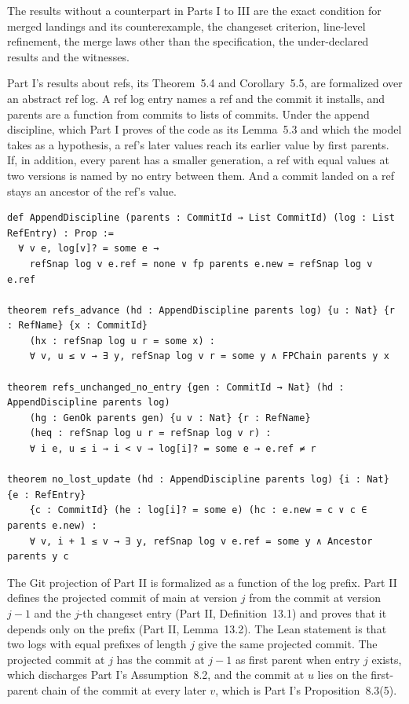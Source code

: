 \documentclass[11pt,letterpaper]{article}
\theoremstyle{definition}
\theoremstyle{remark}
\begin{document}
The results without a counterpart in Parts I to III are the exact condition for merged landings and its counterexample, the changeset criterion, line-level refinement, the merge laws other than the specification, the under-declared results and the witnesses.

Part I's results about refs, its Theorem~5.4 and Corollary~5.5, are formalized over an abstract ref log. A ref log entry names a ref and the commit it installs, and parents are a function from commits to lists of commits. Under the append discipline, which Part I proves of the code as its Lemma~5.3 and which the model takes as a hypothesis, a ref's later values reach its earlier value by first parents. If, in addition, every parent has a smaller generation, a ref with equal values at two versions is named by no entry between them. And a commit landed on a ref stays an ancestor of the ref's value.

\begin{lstlisting}[language=Lean,caption={Refs advance along first-parent chains (\texttt{YonedaTx/Graph.lean})},label={lst:mcbl:refs}]
def AppendDiscipline (parents : CommitId → List CommitId) (log : List RefEntry) : Prop :=
  ∀ v e, log[v]? = some e →
    refSnap log v e.ref = none ∨ fp parents e.new = refSnap log v e.ref

theorem refs_advance (hd : AppendDiscipline parents log) {u : Nat} {r : RefName} {x : CommitId}
    (hx : refSnap log u r = some x) :
    ∀ v, u ≤ v → ∃ y, refSnap log v r = some y ∧ FPChain parents y x

theorem refs_unchanged_no_entry {gen : CommitId → Nat} (hd : AppendDiscipline parents log)
    (hg : GenOk parents gen) {u v : Nat} {r : RefName}
    (heq : refSnap log u r = refSnap log v r) :
    ∀ i e, u ≤ i → i < v → log[i]? = some e → e.ref ≠ r

theorem no_lost_update (hd : AppendDiscipline parents log) {i : Nat} {e : RefEntry}
    {c : CommitId} (he : log[i]? = some e) (hc : e.new = c ∨ c ∈ parents e.new) :
    ∀ v, i + 1 ≤ v → ∃ y, refSnap log v e.ref = some y ∧ Ancestor parents y c
\end{lstlisting}

The Git projection of Part II is formalized as a function of the log prefix. Part II defines the projected commit of main at version $j$ from the commit at version $j-1$ and the $j$-th changeset entry (Part II, Definition~13.1) and proves that it depends only on the prefix (Part II, Lemma~13.2). The Lean statement is that two logs with equal prefixes of length $j$ give the same projected commit. The projected commit at $j$ has the commit at $j-1$ as first parent when entry $j$ exists, which discharges Part I's Assumption~8.2, and the commit at $u$ lies on the first-parent chain of the commit at every later $v$, which is Part I's Proposition~8.3(5).
\end{document}
